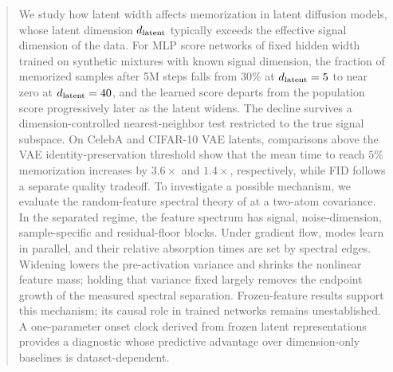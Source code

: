 \begin{abstract}
We study how latent width affects memorization in latent diffusion models, whose latent dimension $\dlat$ typically exceeds the effective signal dimension of the data. For MLP score networks of fixed hidden width trained on synthetic mixtures with known signal dimension, the fraction of memorized samples after 5M steps falls from $30\%$ at $\dlat=5$ to near zero at $\dlat=40$, and the learned score departs from the population score progressively later as the latent widens. The decline survives a dimension-controlled nearest-neighbor test restricted to the true signal subspace. On CelebA and CIFAR-10 VAE latents, comparisons above the VAE identity-preservation threshold show that the mean time to reach $5\%$ memorization increases by $3.6\times$ and $1.4\times$, respectively, while FID follows a separate quality tradeoff. To investigate a possible mechanism, we evaluate the random-feature spectral theory of \citet{bonnaire2025} at a two-atom covariance. In the separated regime, the feature spectrum has signal, noise-dimension, sample-specific and residual-floor blocks. Under gradient flow, modes learn in parallel, and their relative absorption times are set by spectral edges. Widening lowers the pre-activation variance and shrinks the nonlinear feature mass; holding that variance fixed largely removes the endpoint growth of the measured spectral separation. Frozen-feature results support this mechanism; its causal role in trained networks remains unestablished. A one-parameter onset clock derived from frozen latent representations provides a diagnostic whose predictive advantage over dimension-only baselines is dataset-dependent.
\end{abstract}
